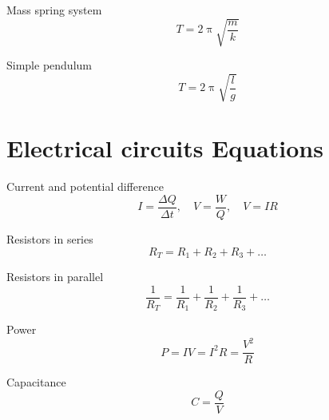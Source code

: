 \documentclass[a4paper,12pt]{book}
\begin{document}
Mass spring system
\begin{equation*}
T=2\uppi\sqrt{\frac{m}{k}}
\end{equation*}

Simple pendulum
\begin{equation*}
T=2\uppi\sqrt{\frac{l}{g}}
\end{equation*}

\section*{Electrical circuits Equations}
Current and potential difference
\begin{equation*}
I=\frac{\Delta Q}{\Delta t}, \quad V=\frac{W}{Q}, \quad V=IR
\end{equation*}

Resistors in series
\begin{equation*}
R_{T}=R_{1}+R_{2}+R_{3}+\dots
\end{equation*}

Resistors in parallel
\begin{equation*}
\frac{1}{R_{T}}=\frac{1}{R_{1}}+\frac{1}{R_{2}}+\frac{1}{R_{3}}+\dots
\end{equation*}

Power
\begin{equation*}
P=IV=I^{2}R=\frac{V^{2}}{R}
\end{equation*}

Capacitance 
\begin{equation*}
C=\frac{Q}{V}
\end{equation*}


\clearpage






\end{document}
